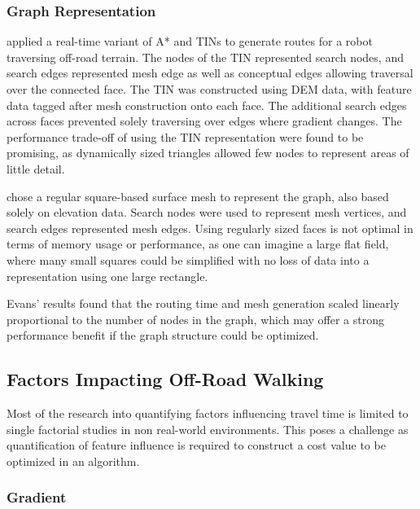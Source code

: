 \documentclass[12pt]{article}
\begin{document}
\subsubsection{Graph Representation}\label{section:context:er:graph}

\textcite{perkins2013fielddstar} applied a real-time variant of A* and TINs to generate routes for a robot traversing off-road terrain. The nodes of the TIN represented search nodes, and search edges represented mesh edge as well as conceptual edges allowing traversal over the connected face. The TIN was constructed using DEM data, with feature data tagged after mesh construction onto each face. The additional search edges across faces prevented solely traversing over edges where gradient changes. The performance trade-off of using the TIN representation were found to be promising, as dynamically sized triangles allowed few nodes to represent areas of little detail.

\textcite{evans2023tsr} chose a regular square-based surface mesh to represent the graph, also based solely on elevation data. Search nodes were used to represent mesh vertices, and search edges represented mesh edges. Using regularly sized faces is not optimal in terms of memory usage or performance, as one can imagine a large flat field, where many small squares could be simplified with no loss of data into a representation using one large rectangle.

Evans' results found that the routing time and mesh generation scaled linearly proportional to the number of nodes in the graph, which may offer a strong performance benefit if the graph structure could be optimized.


\subsection{Factors Impacting Off-Road Walking}

Most of the research into quantifying factors influencing travel time is limited to single factorial studies in non real-world environments. This poses a challenge as quantification of feature influence is required to construct a cost value to be optimized in an algorithm.

\subsubsection{Gradient}
\end{document}

